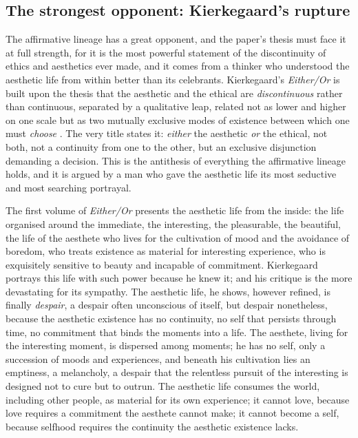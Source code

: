 \subsection{The strongest opponent: Kierkegaard's rupture}
\label{p21:sub:cont-kierkegaard}

The affirmative lineage has a great opponent, and the paper's thesis must face it at full strength, for it is the most powerful statement of the discontinuity of ethics and aesthetics ever made, and it comes from a thinker who understood the aesthetic life from within better than its celebrants. Kierkegaard's \emph{Either/Or} is built upon the thesis that the aesthetic and the ethical are \emph{discontinuous} rather than continuous, separated by a qualitative leap, related not as lower and higher on one scale but as two mutually exclusive modes of existence between which one must \emph{choose} \parencite{kierkegaard1987}. The very title states it: \emph{either} the aesthetic \emph{or} the ethical, not both, not a continuity from one to the other, but an exclusive disjunction demanding a decision. This is the antithesis of everything the affirmative lineage holds, and it is argued by a man who gave the aesthetic life its most seductive and most searching portrayal.

The first volume of \emph{Either/Or} presents the aesthetic life from the inside: the life organised around the immediate, the interesting, the pleasurable, the beautiful, the life of the aesthete who lives for the cultivation of mood and the avoidance of boredom, who treats existence as material for interesting experience, who is exquisitely sensitive to beauty and incapable of commitment. Kierkegaard portrays this life with such power because he knew it; and his critique is the more devastating for its sympathy. The aesthetic life, he shows, however refined, is finally \emph{despair}, a despair often unconscious of itself, but despair nonetheless, because the aesthetic existence has no continuity, no self that persists through time, no commitment that binds the moments into a life. The aesthete, living for the interesting moment, is dispersed among moments; he has no self, only a succession of moods and experiences, and beneath his cultivation lies an emptiness, a melancholy, a despair that the relentless pursuit of the interesting is designed not to cure but to outrun. The aesthetic life consumes the world, including other people, as material for its own experience; it cannot love, because love requires a commitment the aesthete cannot make; it cannot become a self, because selfhood requires the continuity the aesthetic existence lacks.

